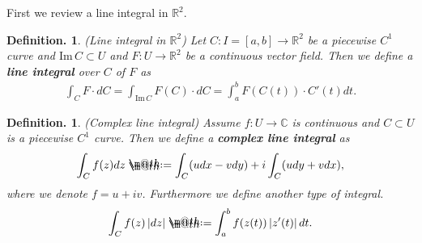 \documentclass[openany, a4paper, oneside]{book}
\makeatletter
\newcommand*{\defeq}{\mathrel{\rlap{%
\raisebox{0.3ex}{$\m@th\cdot$}}%
\raisebox{-0.3ex}{$\m@th\cdot$}}%
=}
\theoremstyle{break}
\theoremstyle{breakdefn}
\newtheorem{defn}[thm]{Definition.}
\newcommand{\abs}[1]{\left|#1\right|}
\newcommand{\bbC}{\mathbb{C}}
\newcommand{\bbR}{\mathbb{R}}
\newcommand{\Image}{\mathrm{Im}\,}
\newcommand{\upbf}[1]{\textup{\textbf{#1}}}
\makeatother
\begin{document}
First we review a line integral in $\bbR^2$.
\begin{defn}\textup{(Line integral in $\bbR^2$)}
 Let $C \colon I=[a,b] \to \bbR^2$ be a piecewise $C^1$ curve and $\Image C \subset U$ and
 $F \colon U \to \bbR^2$ be a continuous vector field.
 Then we define a \upbf{line integral} over $C$ of $F$ as
 \begin{align}
  \int_{C} F \cdot dC
  =
  \int_{\Image C} F (C) \cdot dC
  =
  \int_a^b F (C (t)) \cdot C'(t) dt.
 \end{align}
\end{defn}
\begin{defn}\textup{(Complex line integral)}
 Assume $f \colon U \to \bbC$ is continuous and $C \subset U$ is a piecewise $C^1$ curve.
 Then we define a \upbf{complex line integral} as
 \begin{align}
  \int_C f (z) dz
  \defeq
  \int_C (u dx - v dy) + i \int_C (u dy + v dx),
 \end{align}
 where we denote $f = u + iv$.
 Furthermore we define another type of integral.
 \begin{align}
  \int_C f (z) \abs{dz}
  \defeq
  \int_a^b f (z (t)) \abs{z'(t)} dt.
 \end{align}
\end{defn}
\end{document}
